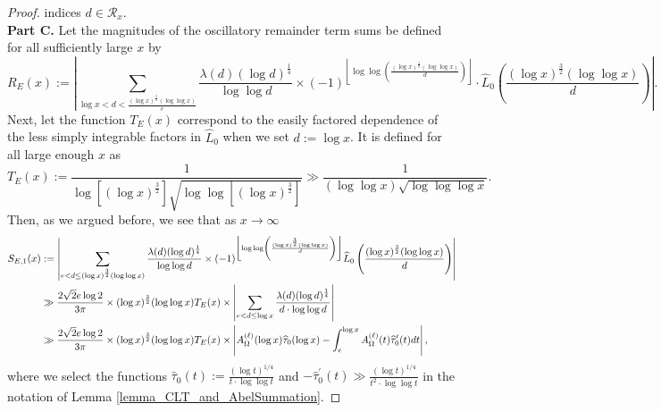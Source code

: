 \documentclass[11pt,reqno,a4letter]{article}
\numberwithin{figure}{section}
\numberwithin{table}{section}
\newcommand{\floor}[1]{\left\lfloor #1 \right\rfloor}
\theoremstyle{plain}
\numberwithin{theorem}{section}
\theoremstyle{definition}
\begin{document}
\begin{proof}
indices $d \in \mathcal{R}_x$. \\ 
\textbf{Part C.} 
Let the magnitudes of the oscillatory remainder term sums be 
defined for all sufficiently large $x$ by 
\[
R_E(x) := \left\lvert \sum_{\log x < d < \frac{(\log x)^{\frac{3}{2}} (\log\log x)}{e}} 
     \frac{\lambda(d) (\log d)^{\frac{1}{4}}}{\log\log d} \times 
     (-1)^{\floor{\log\log\left(\frac{(\log x)^{\frac{3}{2}} (\log\log x)}{d}\right)}} \cdot 
     \widehat{L}_0\left(\frac{(\log x)^{\frac{3}{2}} (\log\log x)}{d}\right) \right\rvert. 
\]
Next, let the function $T_E(x)$ correspond to the 
easily factored dependence of the less simply integrable factors 
in $\widehat{L}_0$ when we set $d := \log x$. 
It is defined for all large enough $x$ as 
\begin{equation} 
\label{eqn_proof_tag_TExFuncDefAndBounds_v1} 
T_E(x) := \frac{1}{\log\left[(\log x)^{\frac{3}{2}}\right] 
     \sqrt{\log\log\left[(\log x)^{\frac{3}{2}}\right]}} \gg 
     \frac{1}{(\log\log x) \sqrt{\log\log\log x}}. 
\end{equation} 
Then, as we argued before, we see that as $x \rightarrow \infty$ 
\begin{align} 
\notag 
S_{E,1}(x) & := \left\lvert \sum_{e < d \leq (\log x)^{\frac{3}{2}} (\log\log x)} 
     \frac{\lambda(d) (\log d)^{\frac{1}{4}}}{\log\log d} \times 
     (-1)^{\floor{\log\log\left(\frac{(\log x)^{\frac{3}{2}} (\log\log x)}{d}\right)}} 
     \widehat{L}_0\left(\frac{(\log x)^{\frac{3}{2}} (\log\log x)}{d}\right) 
     \right\rvert \\ 
\label{eqn_proof_tag_SE1xFuncExp_v1} 
     & \gg \frac{2\sqrt{2} e \log 2}{3\pi} \times (\log x)^{\frac{3}{2}} (\log\log x) 
     T_E(x) \times 
     \left\lvert \sum_{e < d \leq \log x} 
     \frac{\lambda(d) (\log d)^{\frac{1}{4}}}{d \cdot \log\log d} 
     \right\rvert \\ 
\notag 
     & \gg \frac{2\sqrt{2} e \log 2}{3\pi} \times (\log x)^{\frac{3}{2}} (\log\log x) 
     T_E(x) \times 
     \left\lvert A_{\Omega}^{(\ell)}(\log x) \widehat{\tau}_0(\log x) - 
     \int_e^{\log x} A_{\Omega}^{(\ell)}(t) \widehat{\tau}_0^{\prime}(t) dt 
     \right\rvert, 
\end{align} 
where we select the functions $\widehat{\tau}_0(t) := \frac{(\log t)^{1/4}}{t \cdot \log\log t}$ and 
$-\widehat{\tau}^{\prime}_0(t) \gg \frac{(\log t)^{1/4}}{t^2 \cdot \log\log t}$ in the notation of 
Lemma \ref{lemma_CLT_and_AbelSummation}. 


\end{proof}
\end{document}
